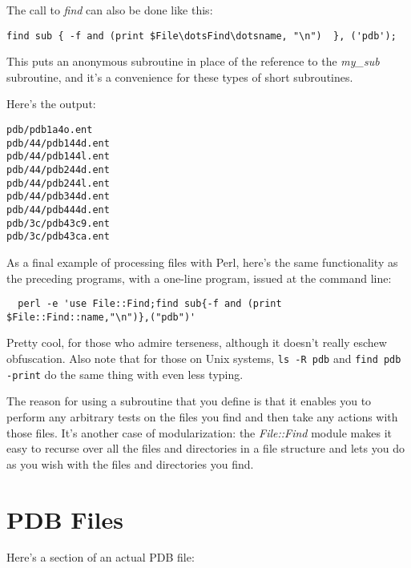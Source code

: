 The call to \textit{find} can also be done like this:

\begin{lstlisting}
find sub { -f and (print $File\dotsFind\dotsname, "\n")  }, ('pdb');
\end{lstlisting}

This puts an anonymous subroutine in place of the reference to the \textit{my\_sub} subroutine, and it's a convenience for these types of short subroutines. 

Here's the output:

\begin{lstlisting}
pdb/pdb1a4o.ent
pdb/44/pdb144d.ent
pdb/44/pdb144l.ent
pdb/44/pdb244d.ent
pdb/44/pdb244l.ent
pdb/44/pdb344d.ent
pdb/44/pdb444d.ent
pdb/3c/pdb43c9.ent
pdb/3c/pdb43ca.ent
\end{lstlisting}

As a final example of processing files with Perl, here's the same functionality as the preceding programs, with a one-line program, issued at the command line: 

\begin{lstlisting}
  perl -e 'use File::Find;find sub{-f and (print $File::Find::name,"\n")},("pdb")'
\end{lstlisting}

Pretty cool, for those who admire terseness, although it doesn't really eschew obfuscation. Also note that for those on Unix systems, \verb|ls -R pdb| and \verb|find pdb -print| do the same thing with even less typing.

The reason for using a subroutine that you define is that it enables you to perform any arbitrary tests on the files you find and then take any actions with those files. It's another case of modularization: the \textit{File::Find} module makes it easy to recurse over all the files and directories in a file structure and lets you do as you wish with the files and directories you find. 

\section{PDB Files}
Here's a section of an actual PDB file:

